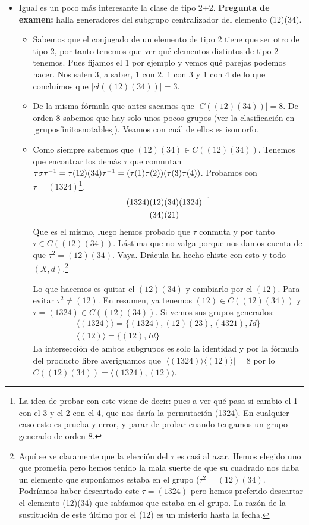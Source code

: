 \begin{ej}
\begin{itemize}
		\item Igual es un poco más interesante la clase de tipo 2+2. \textbf{Pregunta de examen:} halla generadores del subgrupo centralizador del elemento (12)(34).
		\begin{itemize}
			\item Sabemos que el conjugado de un elemento de tipo 2 tiene que ser otro de tipo 2, por tanto tenemos que ver qué elementos distintos de tipo 2 tenemos. Pues fijamos el 1 por ejemplo y vemos qué parejas podemos hacer. Nos salen 3, a saber, 1 con 2, 1 con 3 y 1 con 4 de lo que concluímos que $|cl((12)(34))| = 3$.
			\item De la misma fórmula que antes sacamos que $|C((12)(34))| = 8$. De orden 8 sabemos que hay solo unos pocos grupos (ver la clasificación en \ref{gruposfinitosnotables}). Veamos con cuál de ellos es isomorfo.
			\item Como siempre sabemos que $(12)(34) \in C((12)(34))$. Tenemos que encontrar los demás $\tau$ que conmutan $\tau \sigma \tau^{-1} = \tau (12)(34) \tau^{-1} = (\tau(1)\tau(2))(\tau(3)\tau(4))$. Probamos con $\tau = (1324)$\footnote{La idea de probar con este viene de decir: pues a ver qué pasa si cambio el 1 con el 3 y el 2 con el 4, que nos daría la permutación (1324). En cualquier caso esto es prueba y error, y parar de probar cuando tengamos un grupo generado de orden 8.}.
			\begin{align*}
			(1324)&(12)(34)(1324)^{-1} \\
			&(34)(21)
			\end{align*}
			Que es el mismo, luego hemos probado que $\tau$ conmuta y por tanto $\tau \in C((12)(34))$. Lástima que no valga porque nos damos cuenta de que $\tau ^2 = (12)(34)$. Vaya. Drácula ha hecho chiste con esto y todo $(X,d)$.\footnote{Aquí se ve claramente que la elección del $\tau$ es casi al azar. Hemos elegido uno que prometía pero hemos tenido la mala suerte de que su cuadrado nos daba un elemento que suponíamos estaba en el grupo ($\tau^2 = (12)(34)$. Podríamos haber descartado este $\tau = (1324)$ pero hemos preferido descartar el elemento (12)(34) que sabíamos que estaba en el grupo. La razón de la sustitución de este último por el (12) es un misterio hasta la fecha.}
			
			Lo que hacemos es quitar el $(12)(34)$ y cambiarlo por el $(12)$. Para evitar $\tau^2 \neq (12)$. En resumen, ya tenemos $(12) \in C((12)(34))$ y $\tau = (1324) \in C((12)(34))$. Si vemos sus grupos generados:
			\begin{align*}
			\langle (1324)\rangle = \{(1324), (12)(23), (4321), Id\} \\
			\langle (12) \rangle = \{(12), Id\}
			\end{align*}
			La intersección de ambos subgrupos es solo la identidad y por la fórmula del producto libre averiguamos que $|\langle (1324)\rangle \langle (12) \rangle| = 8$ por lo $C((12)(34)) = \langle (1324), (12) \rangle$.
			

\end{itemize}
\end{itemize}
\end{ej}
